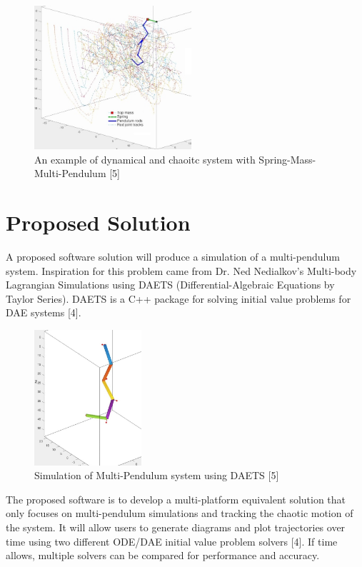 \documentclass{article}
\begin{document}
\begin{figure}[H]
	\centering
	\includegraphics[width=220px]{multi-pend.jpg}
	\caption{An example of dynamical and chaoitc system with Spring-Mass-Multi-Pendulum [5]}
	\label{fig:maxresdefault}
\end{figure}

\section*{Proposed Solution}
A proposed software solution will produce a simulation of a multi-pendulum system. Inspiration for this problem came from Dr. Ned Nedialkov's Multi-body Lagrangian Simulations using DAETS (Differential-Algebraic Equations by Taylor Series). DAETS is a C++ package for solving initial value problems for DAE systems [4].

\begin{figure}[H]
	\centering
	\includegraphics[width=150px]{3pend.jpg}
	\caption{Simulation of Multi-Pendulum system using DAETS [5]}
	\label{fig:maxresdefault}
\end{figure}

The proposed software is to develop a multi-platform equivalent solution that only focuses on multi-pendulum simulations and tracking the chaotic motion of the system. It will allow users to generate diagrams and plot trajectories over time using two different ODE/DAE initial value problem solvers [4]. If time allows, multiple solvers can be compared for performance and accuracy.
\end{document}
